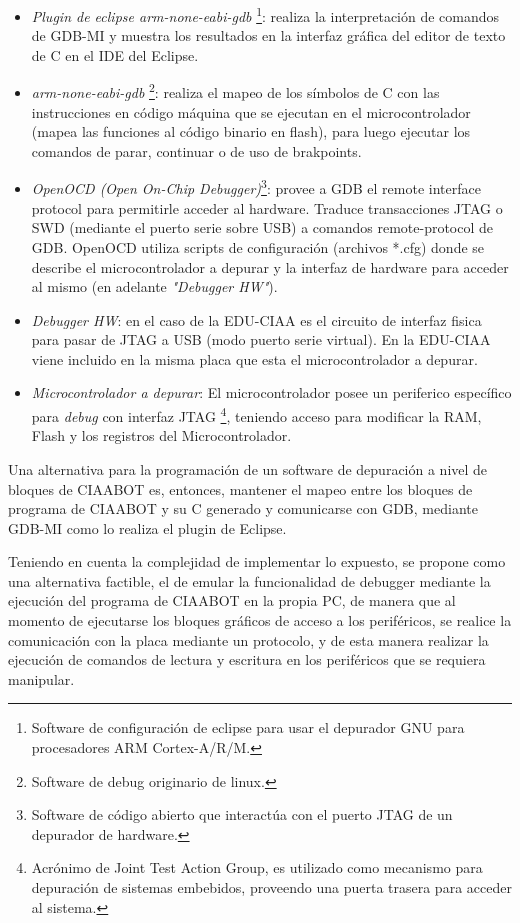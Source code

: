 \begin{itemize}
	\item \emph{Plugin de eclipse arm-none-eabi-gdb}
	\footnote{Software de configuración de eclipse para usar el depurador GNU para procesadores ARM Cortex-A/R/M.}: realiza la interpretación de comandos de	GDB-MI y muestra los resultados en la interfaz gráfica del editor de texto de C en el IDE del Eclipse.
	\item \emph{arm-none-eabi-gdb}
	\footnote{Software de debug originario de linux.}: realiza el mapeo de los símbolos de C con las instrucciones en código máquina que se ejecutan en el microcontrolador (mapea las funciones al código binario en flash), para
	luego ejecutar los comandos de parar, continuar o de uso de brakpoints.
	\item \emph{OpenOCD (Open On-Chip Debugger)}\footnote{Software de código abierto que interactúa con el puerto JTAG de un depurador de hardware.}: provee a GDB el remote interface protocol para permitirle acceder al hardware. Traduce transacciones JTAG o SWD (mediante el puerto serie sobre USB) a comandos remote-protocol de GDB. OpenOCD utiliza scripts de configuración (archivos *.cfg) donde se describe el microcontrolador a depurar y la interfaz de hardware para acceder al mismo (en adelante \emph{"Debugger HW"}).
	\item \emph{Debugger HW}: en el caso de la EDU-CIAA es el circuito de interfaz fisica para pasar de JTAG a USB (modo puerto serie virtual). En la EDU-CIAA
	viene incluido en la misma placa que esta el microcontrolador a depurar.
	\item \emph{Microcontrolador a depurar}: El microcontrolador posee un periferico específico para \emph{debug} con interfaz JTAG
	\footnote{Acrónimo de Joint Test Action Group, es utilizado como mecanismo para depuración de sistemas embebidos, proveendo una puerta trasera para acceder al sistema.}, teniendo acceso para modificar la RAM, Flash y los registros del Microcontrolador.
\end{itemize}

Una alternativa para la programación de un software de depuración a nivel de bloques de CIAABOT es, entonces, mantener el mapeo entre los bloques de programa de CIAABOT y su C generado y comunicarse con GDB, mediante GDB-MI como lo realiza el plugin de Eclipse.

Teniendo en cuenta la complejidad de implementar lo expuesto, se propone como una alternativa factible, el de emular la funcionalidad de debugger mediante la ejecución del programa de CIAABOT en la propia PC, de manera que al momento de ejecutarse los bloques gráficos de acceso a los periféricos, se realice la comunicación con la placa mediante un protocolo, y de esta manera realizar la ejecución de comandos de lectura y escritura en los periféricos que se requiera manipular.

